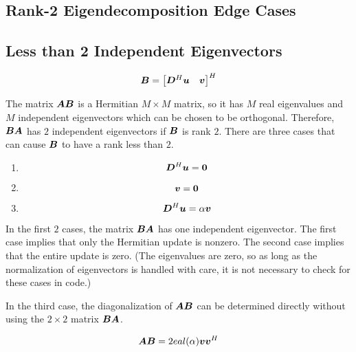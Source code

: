 \begin{appendices}
\chapter{Rank-2 Eigendecomposition Edge Cases} \label{chapter:eigenedge}

\section{Less than 2 Independent Eigenvectors}

\begin{equation}
\bm{B} = \begin{bmatrix} \bm{D}^H\bm{u} & \bm{v}\end{bmatrix}^H
\end{equation}


The matrix $\bm{A}\bm{B}$ is a Hermitian $M \times M$ matrix, so it has $M$ real eigenvalues and $M$ independent eigenvectors which can be chosen to be orthogonal. Therefore, $\bm{B}\bm{A}$ has $2$ independent eigenvectors if $\bm{B}$ is rank $2$.  There are three cases that can cause $\bm{B}$ to have a rank less than $2$.


\begin{enumerate}
\item
\begin{equation}
\bm{D}^H\bm{u} = \bm{0}
\end{equation}
\item

\begin{equation}
\bm{v} = \bm{0}
\end{equation}
\item
\begin{equation}
\bm{D}^H\bm{u} = \alpha \bm{v}
\end{equation}
\end{enumerate}

In the first $2$ cases, the matrix $\bm{B}\bm{A}$ has one independent eigenvector. The first case implies that only the Hermitian update is nonzero.  The second case implies that the entire update is zero. (The eigenvalues are zero, so as long as the normalization of eigenvectors is handled with care, it is not necessary to check for these cases in code.)

In the third case, the diagonalization of $\bm{A}\bm{B}$ can be determined directly without using the $2 \times 2$ matrix $\bm{B}\bm{A}$.

\begin{equation}
\bm{A}\bm{B} = 2
eal(\alpha)\bm{v}\bm{v}^H
\end{equation}


\end{appendices}
